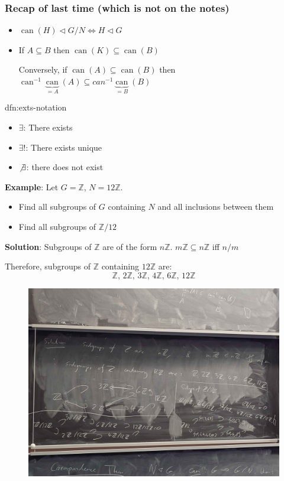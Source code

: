 \documentclass{article}
\DeclareMathOperator{\can}{can}
\begin{document}
\subsubsection{Recap of last time (which is not on the notes)}

\begin{itemize}
    \item $\can(H) \triangleleft G /N \iff H \triangleleft G$
    \item If $A \subseteq B$ then $\can(K) \subseteq \can (B)$

        Conversely, if $\can(A) \subseteq \can(B)$ then $\can^{-1} \underbrace{\can}_{=A}(A) \subseteq can^{-1} \underbrace{\can}_{=B} (B)$
\end{itemize}

\begin{dfn}{dfn:exts-notation}{}
    \begin{itemize}
        \item $\exists$: There exists
        \item $\exists!$: There exists unique
        \item $\not \exists$: there does not exist
    \end{itemize}
\end{dfn}

\textbf{Example}: Let $G = \mathbb{Z}$, $N = 12\mathbb{Z}$.
\begin{itemize}
    \item Find all subgroups of $G$ containing $N$ and all inclusions between them
    \item Find all subgroups of $\mathbb{Z} / 12$
\end{itemize}

\textbf{Solution}: Subgroups of $\mathbb{Z}$ are of the form $n\mathbb{Z}$. $m\mathbb{Z} \subseteq n\mathbb{Z}$ iff $n / m$

Therefore, subgroups of $\mathbb{Z}$ containing $12\mathbb{Z}$ are:
\[\mathbb{Z},\,2\mathbb{Z},\,3\mathbb{Z},\,4\mathbb{Z},\,6\mathbb{Z},\,12\mathbb{Z}\]

\begin{figure}[H]
    \centering
    \includegraphics[width=\linewidth]{images/subgroup-diagram.jpg}
\end{figure}
\end{document}
